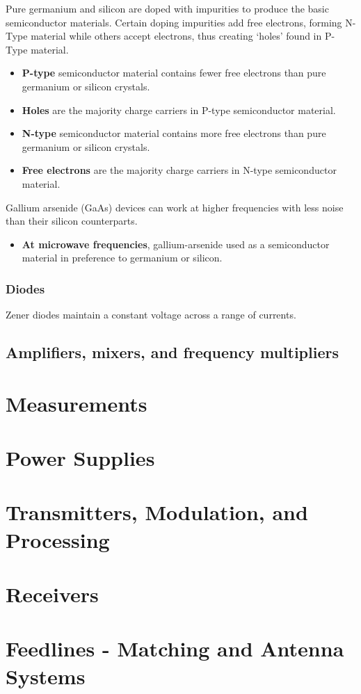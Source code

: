 \documentclass[letterpaper]{article}
\begin{document}
        Pure germanium and silicon are doped with impurities to produce the basic semiconductor materials.
        Certain doping impurities add free electrons, forming N-Type material while others accept electrons, thus creating `holes' found in P-Type material.
        \begin{itemize}
            \item \textbf{P-type} semiconductor material contains fewer free electrons than pure germanium or silicon crystals.
            \item \textbf{Holes} are the majority charge carriers in P-type semiconductor material.
            \item \textbf{N-type} semiconductor material contains more free electrons than pure germanium or silicon crystals.
            \item \textbf{Free electrons} are the majority charge carriers in N-type semiconductor material.
        \end{itemize}

        Gallium arsenide (GaAs) devices can work at higher frequencies with less noise than their silicon counterparts.
        \begin{itemize}
            \item \textbf{At microwave frequencies}, gallium-arsenide used as a semiconductor material in preference to germanium or silicon.
        \end{itemize}

        \subsubsection{Diodes}

        Zener diodes maintain a constant voltage across a range of currents.

        \newpage

        \subsection{Amplifiers, mixers, and frequency multipliers}

        \newpage

        \section{Measurements}

        \newpage

        \section{Power Supplies}

    \newpage

    \section{Transmitters, Modulation, and Processing}

    \newpage

    \section{Receivers}

    \newpage

    \section{Feedlines - Matching and Antenna Systems}
\end{document}
